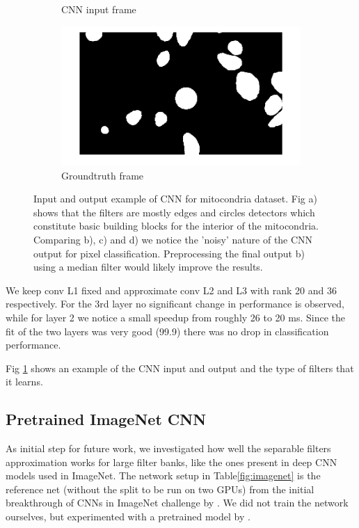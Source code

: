 \begin{figure}[h!]
\begin{subfigure}[b]{0.40\textwidth}
    \caption{CNN input frame}
  \end{subfigure}
  \begin{subfigure}[b]{0.40\textwidth}
    \includegraphics[width=\textwidth]{images/GTframe1.png}
    \caption{Groundtruth frame}
  \end{subfigure}
  \caption{Input and output example of CNN for mitocondria dataset. Fig a) shows that the filters are mostly edges and circles detectors which constitute basic building blocks for the interior of the mitocondria.
  Comparing b), c) and d) we notice the 'noisy' nature of the CNN output for pixel classification. Preprocessing the final output b) using a median filter would likely improve the results.}
  \label{fig:mitocondria}
\end{figure}
We keep conv L1 fixed and approximate conv L2 and L3 with rank 20 and 36 respectively. For the 3rd layer no significant change in performance is observed, while for layer 2 we notice a small speedup from roughly 26 to 20 ms. Since the fit of the two layers was very good (99.9) there was no drop in classification performance.

Fig \ref{fig:mitocondria} shows an example of the CNN input and output and the type of filters that it learns. 
\subsection{Pretrained ImageNet CNN}
As initial step for future work, we investigated how well the separable filters approximation works for large filter banks, like the ones present in deep CNN models used in ImageNet. The network setup in Table\ref{fig:imagenet} is the reference net (without the split to be run on two GPUs) from the initial breakthrough of CNNs in ImageNet challenge by \cite{Krizhevsky_imagenetclassification}. We did not train the network ourselves, but experimented with a pretrained model by \cite{chatfield14return}.

